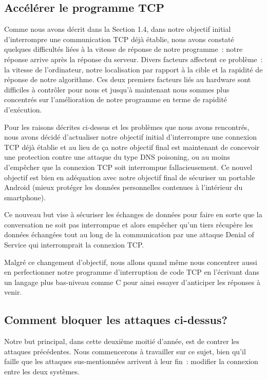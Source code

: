 \documentclass[a4paper, 12pt,twoside]{article}
\begin{document}
     \subsection{Accélérer le programme TCP}

    Comme nous avons décrit dans la Section 1.4,  dans notre objectif initial d'interrompre une communication TCP déjà établie, nous avons constaté quelques difficultés liées à la vitesse de réponse de notre programme~: notre réponse arrive après la réponse du serveur. Divers facteurs affectent ce problème~: la vitesse de l'ordinateur, notre localisation par rapport à la cible et la rapidité de réponse de notre algorithme. Ces deux premiers facteurs liés au hardware sont difficiles à contrôler pour nous et jusqu'à maintenant nous sommes plus concentrés sur l'amélioration de notre programme en terme de rapidité d'exécution.

    Pour les raisons décrites ci-dessus et les problèmes que nous avons rencontrés, nous avons décidé d'actualiser notre objectif initial d'interrompre une connexion TCP déjà établie et au lieu de ça notre objectif final est maintenant de concevoir une protection contre une attaque du type DNS poisoning, ou au moins d'empêcher que la connexion TCP soit interrompue fallacieusement. Ce nouvel objectif est bien en adéquation avec notre objectif final de sécuriser un portable Android (mieux protéger les données personnelles contenues à l'intérieur du smartphone).

    Ce nouveau but vise à sécuriser les échanges de données pour faire en sorte que la conversation ne soit pas interrompue et alors empêcher qu'un tiers récupère les données échangées tout au long de la communication par une attaque Denial of Service qui interromprait la connexion TCP.

    Malgré ce changement d'objectif, nous allons quand même nous concentrer aussi en perfectionner notre programme d'interruption de code TCP en l'écrivant dans un langage plus bas-niveau comme C pour ainsi essayer d'anticiper les réponses à venir.
    
    \subsection{Comment bloquer les attaques ci-dessus?}

    Notre but principal, dans cette deuxième moitié d'année, est de contrer les attaques précédentes. Nous commencerons à travailler sur ce sujet, bien qu'il faille que les attaques sus-mentionnées arrivent à leur fin~: modifier la connexion entre les deux systèmes.
\end{document}
